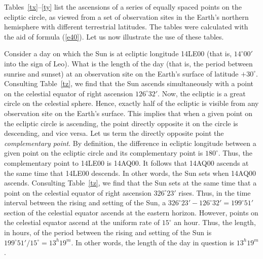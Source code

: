 Tables~\ref{tx}--\ref{ty} list the ascensions of a series of equally spaced points on the ecliptic
circle, as viewed from a set of observation sites in the Earth's northern
hemisphere with different terrestrial latitudes. The tables were calculated with the aid of
formula (\ref{e40}). Let us now illustrate the use of these tables.

Consider a day on which the Sun is at ecliptic longitude 14LE00 (that is, 
$14^\circ 00'$ into the sign of Leo). What is the length of the day (that is, the period between sunrise and sunset) at
an observation site on the Earth's surface of latitude $+30^\circ$. Consulting
Table~\ref{tz}, we find that the Sun ascends simultaneously with a
point on the celestial equator of right ascension $126^\circ 32'$. Now,
the ecliptic is a great circle on the celestial sphere. Hence, exactly half of the ecliptic
is  visible from any observation site on the Earth's surface. This implies that
when a given point on the ecliptic circle is ascending, the point directly
opposite it on the circle is descending, and vice versa. Let us
term the directly opposite point the {\em complementary point}. 
By definition, the difference in ecliptic longitude between a given point on the
ecliptic circle and its complementary point is $180^\circ$. Thus, the
complementary point to 14LE00 is 14AQ00. It follows that
 14AQ00 ascends at the same time that 14LE00 descends.
 In other words, the Sun sets when 14AQ00 ascends.
 Consulting Table~\ref{tz}, we find that the Sun sets at the
 same time that a point on the celestial equator of right ascension 
 $326^\circ 23'$ rises. Thus, in the time interval between the rising and
 setting  of the Sun, a $326^\circ23'-126^\circ 32' = 199^\circ 51'$ section
 of the celestial equator ascends at the eastern horizon. However, points on the celestial
 equator ascend at the uniform rate of $15^\circ$ an hour. Thus,
 the length, in hours,  of the period between the rising and setting of the Sun  is $199^\circ 51'/15^\circ = 13^h 19^m.$ In other words, the
 length of the day in question is $13^h 19^m$.
 
